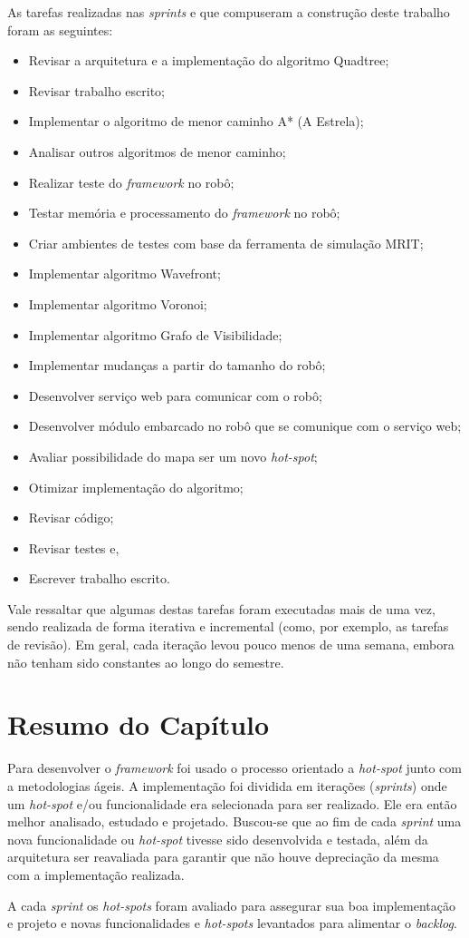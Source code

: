 As tarefas realizadas nas \textit{sprints} e que compuseram a construção deste trabalho foram as seguintes:
\begin{itemize}
  \item Revisar a arquitetura e a implementação do algoritmo Quadtree;
  \item Revisar trabalho escrito;
  \item Implementar o algoritmo de menor caminho A* (A Estrela);
  \item Analisar outros algoritmos de menor caminho;
  \item Realizar teste do \textit{framework} no robô;
  \item Testar memória e processamento do \textit{framework} no robô;
  \item Criar ambientes de testes com base da ferramenta de simulação MRIT;
  \item Implementar algoritmo Wavefront;
  \item Implementar algoritmo Voronoi;
  \item Implementar algoritmo Grafo de Visibilidade;
  \item Implementar mudanças a partir do tamanho do robô;
  \item Desenvolver serviço web para comunicar com o robô;
  \item Desenvolver módulo embarcado no robô que se comunique com o serviço web;
  \item Avaliar possibilidade do mapa ser um novo \textit{hot-spot};
  \item Otimizar implementação do algoritmo;
  \item Revisar código;
  \item Revisar testes e,
  \item Escrever trabalho escrito.
\end{itemize}

Vale ressaltar que algumas destas tarefas foram executadas mais de uma vez, sendo realizada de forma iterativa e incremental (como, por exemplo, as tarefas de revisão). Em geral, cada iteração levou pouco menos de uma semana, embora não tenham sido constantes ao longo do semestre.

\section{Resumo do Capítulo}

Para desenvolver o \textit{framework} foi usado o processo orientado a \textit{hot-spot} junto com a metodologias ágeis. A implementação foi dividida em iterações (\textit{sprints}) onde um \textit{hot-spot} e/ou funcionalidade era selecionada para ser realizado. Ele era então melhor analisado, estudado e projetado. Buscou-se que ao fim de cada \textit{sprint} uma nova funcionalidade ou \textit{hot-spot} tivesse sido desenvolvida e testada, além da arquitetura ser reavaliada para garantir que não houve depreciação da mesma com a implementação realizada.

A cada \textit{sprint} os \textit{hot-spots} foram avaliado para assegurar sua boa implementação e projeto e novas funcionalidades e \textit{hot-spots} levantados para alimentar o \textit{backlog}.